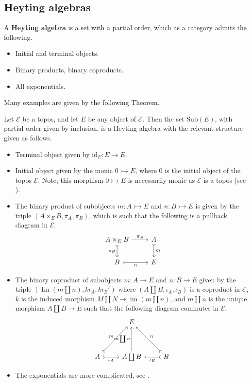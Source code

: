 \documentclass{tac}
\newcommand{\call}[1]{\mathcal{#1}}
\newcommand{\lto}{\longrightarrow}
\begin{document}
	\subsection{Heyting algebras}
	\begin{definition}
		A \textbf{Heyting algebra} is a set with a partial order, which as a category admits the following.
		\begin{itemize}
			\item Initial and terminal objects.
			\item Binary products, binary coproducts.
			\item All exponentials.
		\end{itemize}
	\end{definition}
	Many examples are given by the following Theorem.
	\begin{theorem}
		\label{thm:heyting_sub}
		Let $\call{E}$ be a topos, and let $E$ be any object of $\call{E}$. Then the set $\text{Sub}(E)$, with partial order given by inclusion, is a Heyting algebra with the relevant structure given as follows.
		\begin{itemize}
			\item Terminal object given by $\text{id}_E: E \to E$.
			\item Initial object given by the monic $0 \rightarrowtail E$, where $0$ is the initial object of the topos $\call{E}$. Note; this morphism $0 \rightarrowtail E$ is necessarily monic as $\call{E}$ is a topos (see \cite[\S A1.4.1]{Johnstone}).
			\item The binary product of subobjects $m: A \rightarrowtail E$ and $n: B \rightarrowtail E$ is given by the triple $(A \times_{E} B,\pi_A,\pi_B)$, which is such that the following is a pullback diagram in $\call{E}$.
			\[
			\begin{tikzcd}
				A \times_E B\arrow[r,"{\pi_A}"]\arrow[d,swap,rightarrowtail,"{\pi_B}"] & A\arrow[d,rightarrowtail,"m"]\\
				B\arrow[r,swap,rightarrowtail,"{n}"] & E
			\end{tikzcd}
			\]
			\item The binary coproduct of subobjects $m: A \rightarrow E$ and $n: B \rightarrow E$ given by the triple $(\operatorname{Im}(m\coprod n), k\iota_A,k\iota_B')$ where $(A \coprod B, \iota_A,\iota_B)$ is a coproduct in $\call{E}$, $k$ is the induced morphism $M \coprod N \lto \operatorname{im}(m \coprod n)$, and $m \coprod n$ is the unique morphism $A \coprod B \to E$ such that the following diagram commutes in $\call{E}$.
			\[
			\begin{tikzcd}[row sep = huge]
				& E\\
				A\arrow[ur,rightarrowtail,"{m}"]\arrow[r,swap,rightarrowtail,"{\iota_A}"] & A \coprod B\arrow[u,"{m \coprod n}"] & B\arrow[ul,swap,rightarrowtail,"{n}"]\arrow[l,rightarrowtail,"{\iota_B}"]
			\end{tikzcd}
			\]
			\item The exponentials are more complicated, see \cite[\S A1.4.13]{Johnstone}.
		\end{itemize}
	\end{theorem}
\end{document}

